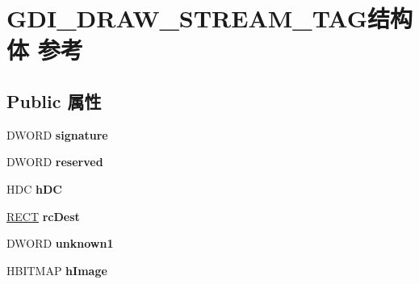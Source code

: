 \hypertarget{struct_g_d_i___d_r_a_w___s_t_r_e_a_m___t_a_g}{}\section{G\+D\+I\+\_\+\+D\+R\+A\+W\+\_\+\+S\+T\+R\+E\+A\+M\+\_\+\+T\+A\+G结构体 参考}
\label{struct_g_d_i___d_r_a_w___s_t_r_e_a_m___t_a_g}
\subsection*{Public 属性}
\begin{DoxyCompactItemize}
\item 
\mbox{\label{struct_g_d_i___d_r_a_w___s_t_r_e_a_m___t_a_g_af81809ab4d0723cc55ee4db9f658ecdd}} 
D\+W\+O\+RD {\bfseries signature}
\item 
\mbox{\label{struct_g_d_i___d_r_a_w___s_t_r_e_a_m___t_a_g_a12e9fed69758d8e842fdf601c24bfb6b}} 
D\+W\+O\+RD {\bfseries reserved}
\item 
\mbox{\label{struct_g_d_i___d_r_a_w___s_t_r_e_a_m___t_a_g_ad5211b7662144bd2aa463ee1e00ff4ca}} 
H\+DC {\bfseries h\+DC}
\item 
\mbox{\label{struct_g_d_i___d_r_a_w___s_t_r_e_a_m___t_a_g_afe340a639b325388671a27e9ae19a98f}} 
\hyperlink{structtag_r_e_c_t}{R\+E\+CT} {\bfseries rc\+Dest}
\item 
\mbox{\label{struct_g_d_i___d_r_a_w___s_t_r_e_a_m___t_a_g_a253dd30e9447573e20f80ca299b39a07}} 
D\+W\+O\+RD {\bfseries unknown1}
\item 
\mbox{\label{struct_g_d_i___d_r_a_w___s_t_r_e_a_m___t_a_g_ad2b6e73617d619b4017e179572842035}} 
H\+B\+I\+T\+M\+AP {\bfseries h\+Image}
\item 
\mbox{\label{struct_g_d_i___d_r_a_w___s_t_r_e_a_m___t_a_g_a266c506bfdf2dfb8968035ffdf204fc8}} 

\end{DoxyCompactItemize}
